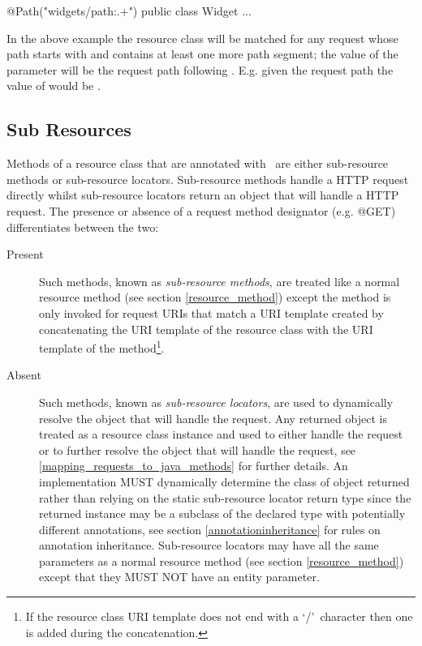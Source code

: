 \begin{listing}{1}
@Path("widgets/{path:.+}")
public class Widget {
  ...
}\end{listing}

In the above example the  resource class will be matched for any request whose path starts with  and contains at least one more path segment; the value of the  parameter will be the request path following . E.g. given the request path  the value of  would be .

\subsection{Sub Resources}
\label{sub_resources}

Methods of a resource class that are annotated with \Path\ are either sub-resource methods or sub-resource locators. Sub-resource methods handle a HTTP request directly whilst sub-resource locators return an object that will handle a HTTP request. The presence or absence of a request method designator (e.g. @GET) differentiates between the two:

\begin{description}
\item[Present] Such methods, known as {\em sub-resource methods}, are treated like a normal resource method (see section \ref{resource_method}) except the method is only invoked for request URIs that match a URI template created by concatenating the URI template of the resource class with the URI template of the method\footnote{If the resource class URI template does not end with a \lq/\rq\ character then one is added during the concatenation.}.
\item[Absent] Such methods, known as {\em sub-resource locators}, are used to dynamically resolve the object that will handle the request. Any returned object is treated as a resource class instance and used to either handle the request or to further resolve the object that will handle the request, see \ref{mapping_requests_to_java_methods} for further details. An implementation MUST dynamically determine the class of object returned rather than relying on the static sub-resource locator return type since the returned instance may be a subclass of the declared type with potentially different annotations, see section \ref{annotationinheritance} for rules on annotation inheritance. Sub-resource locators may have all the same parameters as a normal resource method (see section \ref{resource_method}) except that they MUST NOT have an entity parameter. 
\end{description}

